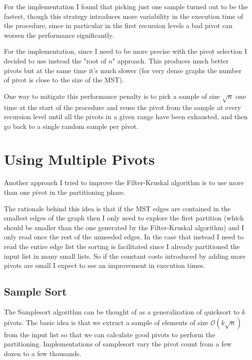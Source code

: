 \documentclass{article}
\begin{document}
For the  implementation I found that picking just one sample turned out to be the fastest, though this strategy introduces more variability in the execution time of the procedure, since in particular in the first recursion levels a bad pivot can worsen the performance significantly.

For the  implementation, since I need to be more precise with the pivot selection I decided to use instead the "root of $n$" approach. This produces much better pivots but at the same time it's much slower (for very dense graphs the number of pivot is close to the size of the MST). 

One way to mitigate this performance penalty is to pick a sample of size $\sqrt n$ one time at the start of the procedure and reuse the pivot from the sample at every recursion level until all the pivots in a given range have been exhausted, and then go back to a single random sample per pivot.

\section{Using Multiple Pivots}

Another approach I tried to improve the Filter-Kruskal algorithm is to use more than one pivot in the partitioning phase.

The rationale behind this idea is that if the MST edges are contained in the smallest edges of the graph then I only need to explore the first partition (which should be smaller than the one generated by the Filter-Kruskal algorithm) and I only read once the rest of the unneeded edges. In the case that instead I need to read the entire edge list the sorting is facilitated since I already partitioned the input list in many small lists. So if the constant costs introduced by adding more pivots are small I expect to see an improvement in execution times.

\subsection{Sample Sort}

The Samplesort algorithm can be thought of as a generalization of quicksort to $k$ pivots. The basic idea is that we extract a sample of elements of size $\mathcal O(k\sqrt n)$ from the input list so that we can calculate good pivots to perform the partitioning. Implementations of samplesort vary the pivot count from a few dozen to a few thousands.
\end{document}
